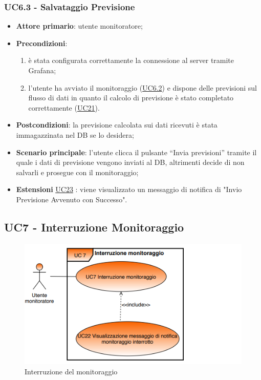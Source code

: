 	\label{par:UC6.3}
	\subsubsection{UC6.3 - Salvataggio Previsione}
		\begin{itemize}
			\item\textbf{Attore primario}: utente monitoratore;
			\item\textbf{Precondizioni}:
				\begin{enumerate}
					\item è stata configurata correttamente la connessione al server tramite Grafana;
					\item l’utente ha avviato il monitoraggio (\hyperref[par:UC6.2]{UC6.2}) e dispone delle previsioni sul flusso di dati in quanto il calcolo di previsione è stato completato correttamente (\hyperref[par:UC21]{UC21}).
				\end{enumerate}
			\item\textbf{Postcondizioni}: la previsione calcolata sui dati ricevuti è stata immagazzinata nel DB se lo desidera;
			\item\textbf{Scenario principale}: l’utente clicca il pulsante “Invia previsioni” tramite il quale i dati di previsione vengono inviati al DB, altrimenti decide di non salvarli e prosegue con il monitoraggio;
			\item\textbf{Estensioni} \hyperref[par:UC23]{UC23} : viene visualizzato un messaggio di notifica di "Invio Previsione Avvenuto con Successo".
		\end{itemize}	


	\label{par:UC7}
	\subsection{UC7 - Interruzione Monitoraggio}

	\begin{figure}[H]
		\centering
		\includegraphics[scale=0.80]{../Analisi_dei_requisiti/img/Diagrammi_UML/UC7_Interruzione_monitoraggio.png}
		\caption{Interruzione del monitoraggio}
	\end{figure}

